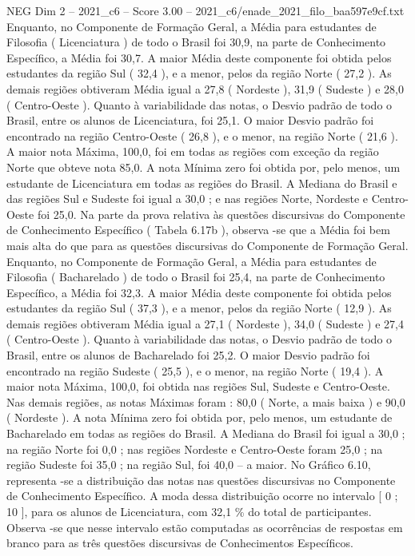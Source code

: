 \begin{textsample}{NEG Dim 2 – 2021\_c6 – Score 3.00 – 2021\_c6/enade\_2021\_filo\_baa597e9cf.txt}
Enquanto, no Componente de Formação Geral, a Média para estudantes de Filosofia ( Licenciatura ) de todo o Brasil foi 30,9, na parte de Conhecimento Específico, a Média foi 30,7.
A maior Média deste componente foi obtida pelos estudantes da região Sul ( 32,4 ), e a menor, pelos da região Norte ( 27,2 ).
As demais regiões obtiveram Média igual a 27,8 ( Nordeste ), 31,9 ( Sudeste ) e 28,0 ( Centro-Oeste ).
Quanto à variabilidade das notas, o Desvio padrão de todo o Brasil, entre os alunos de Licenciatura, foi 25,1.
O maior Desvio padrão foi encontrado na região Centro-Oeste ( 26,8 ), e o menor, na região Norte ( 21,6 ).
A maior nota Máxima, 100,0, foi em todas as regiões com exceção da região Norte que obteve nota 85,0.
A nota Mínima zero foi obtida por, pelo menos, um estudante de Licenciatura em todas as regiões do Brasil.
A Mediana do Brasil e das regiões Sul e Sudeste foi igual a 30,0 ; e nas regiões Norte, Nordeste e Centro-Oeste foi 25,0.
Na parte da prova relativa às questões discursivas do Componente de Conhecimento Específico ( Tabela 6.17b ), observa -se que a Média foi bem mais alta do que para as questões discursivas do Componente de Formação Geral.
Enquanto, no Componente de Formação Geral, a Média para estudantes de Filosofia ( Bacharelado ) de todo o Brasil foi 25,4, na parte de Conhecimento Específico, a Média foi 32,3.
A maior Média deste componente foi obtida pelos estudantes da região Sul ( 37,3 ), e a menor, pelos da região Norte ( 12,9 ).
As demais regiões obtiveram Média igual a 27,1 ( Nordeste ), 34,0 ( Sudeste ) e 27,4 ( Centro-Oeste ).
Quanto à variabilidade das notas, o Desvio padrão de todo o Brasil, entre os alunos de Bacharelado foi 25,2.
O maior Desvio padrão foi encontrado na região Sudeste ( 25,5 ), e o menor, na região Norte ( 19,4 ).
A maior nota Máxima, 100,0, foi obtida nas regiões Sul, Sudeste e Centro-Oeste.
Nas demais regiões, as notas Máximas foram : 80,0 ( Norte, a mais baixa ) e 90,0 ( Nordeste ).
A nota Mínima zero foi obtida por, pelo menos, um estudante de Bacharelado em todas as regiões do Brasil.
A Mediana do Brasil foi igual a 30,0 ; na região Norte foi 0,0 ; nas regiões Nordeste e Centro-Oeste foram 25,0 ; na região Sudeste foi 35,0 ; na região Sul, foi 40,0 – a maior.
No Gráfico 6.10, representa -se a distribuição das notas nas questões discursivas no Componente de Conhecimento Específico.
A moda dessa distribuição ocorre no intervalo [ 0 ; 10 ], para os alunos de Licenciatura, com 32,1 \% do total de participantes.
Observa -se que nesse intervalo estão computadas as ocorrências de respostas em branco para as três questões discursivas de Conhecimentos Específicos.

\end{textsample}
